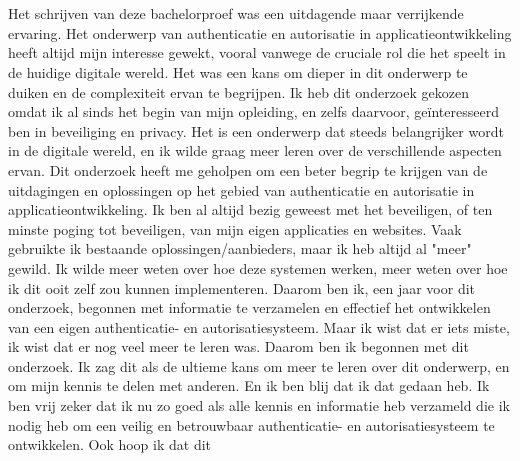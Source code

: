 
\chapter*{}%
\label{ch:voorwoord}


Het schrijven van deze bachelorproef was een uitdagende maar verrijkende ervaring. Het onderwerp van authenticatie en autorisatie in applicatieontwikkeling heeft altijd mijn interesse gewekt, 
vooral vanwege de cruciale rol die het speelt in de huidige digitale wereld. Het was een kans om dieper in dit onderwerp te duiken en de complexiteit ervan te begrijpen.
Ik heb dit onderzoek gekozen omdat ik al sinds het begin van mijn opleiding, en zelfs daarvoor, geïnteresseerd ben in beveiliging en privacy. Het is een onderwerp dat steeds belangrijker wordt 
in de digitale wereld, en ik wilde graag meer leren over de verschillende aspecten ervan. Dit onderzoek heeft me geholpen om een beter begrip te krijgen van de uitdagingen en oplossingen op het gebied van
authenticatie en autorisatie in applicatieontwikkeling.
\newline
Ik ben al altijd bezig geweest met het beveiligen, of ten minste poging tot beveiligen, van mijn eigen applicaties en websites. Vaak gebruikte ik bestaande oplossingen/aanbieders, maar ik heb altijd al "meer" gewild.
Ik wilde meer weten over hoe deze systemen werken, meer weten over hoe ik dit ooit zelf zou kunnen implementeren. Daarom ben ik, een jaar voor dit onderzoek, begonnen met informatie te verzamelen en
effectief het ontwikkelen van een eigen authenticatie- en autorisatiesysteem. Maar ik wist dat er iets miste, ik wist dat er nog veel meer te leren was.
\newline
Daarom ben ik begonnen met dit onderzoek. Ik zag dit als de ultieme kans om meer te leren over dit onderwerp, en om mijn kennis te delen met anderen. En ik ben blij dat ik dat gedaan heb.
Ik ben vrij zeker dat ik nu zo goed als alle kennis en informatie heb verzameld die ik nodig heb om een veilig en betrouwbaar authenticatie- en autorisatiesysteem te ontwikkelen. Ook hoop ik dat dit
